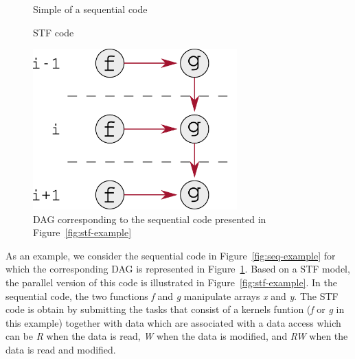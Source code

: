 \documentclass{article}
\begin{document}
\begin{figure}[!h]
  \begin{minipage}{0.5\textwidth}
    \centering {}
    
    \caption{\label{fig:seq-example}Simple of a sequential code}
    \vspace{0.5cm}
    \centering 
    \caption{\label{fig:stf-example}STF code}
  \end{minipage}
  \hspace{0.5cm}
  \begin{minipage}{0.5\textwidth}
    \centering
    \includegraphics[width=0.7\textwidth]{figures/example_dag}
    \caption{\label{fig:dag-example}DAG corresponding to the
      sequential code presented in Figure~\ref{fig:stf-example}}
  \end{minipage}
\end{figure}

As an example, we consider the sequential code in
Figure~\ref{fig:seq-example} for which the corresponding DAG is
represented in Figure~\ref{fig:dag-example}. Based on a STF model, the
parallel version of this code is illustrated in
Figure~\ref{fig:stf-example}. In the sequential code, the two
functions \textit{f} and \textit{g} manipulate arrays \textit{x} and
\textit{y}. The STF code is obtain by submitting the tasks that
consist of a kernels funtion (\textit{f} or \textit{g} in this
example) together with data which are associated with a data access
which can be \textit{R} when the data is read, \textit{W} when the
data is modified, and \textit{RW} when the data is read and modified.
\end{document}
